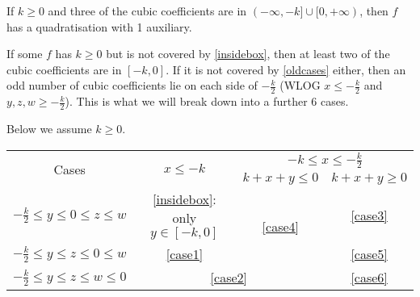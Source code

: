 \documentclass[11pt]{scrartcl}
\begin{document}
\begin{proposition}
	\label{insidebox}
If $k \ge 0$ and three of the cubic coefficients are in $(-\infty, -k] \cup [0, +\infty)$, then $f$ has a quadratisation with 1 auxiliary.
\end{proposition}

If some $f$ has $k \ge 0$ but is not covered by \ref{insidebox}, then at least two of the cubic coefficients are in $[-k, 0]$. 
If it is not covered by \ref{oldcases} either, then an odd number of cubic coefficients lie on each side of $-\frac{k}{2}$
(WLOG $x \le -\frac{k}{2}$ and $y, z, w \ge -\frac{k}{2}$). This is what we will break down into a further $6$ cases.

Below we assume $k \ge 0$.
\begin{table}[h!]
	\centering
	\begin{tabular}{|c|c|c|c|}
	\hline
	\multirow{2}{*}{Cases} &\multirow{2}{*}{$x \le -k$} &  \multicolumn{2}{c|}{$-k \le x \le -\frac{k}{2}$} \\\cline{3-4}
	
	& & $k + x + y \le 0$& $k + x + y \ge 0$ \\
		\hline 
		$ -\frac{k}{2} \le y \le 0 \le z \le w$ & \ref{insidebox}: only $y \in [-k,0]$ &  \multirow{2}{*}{\ref{case4}} & 
		\ref{case3}\\\cline{1-2}\cline{4-4}
		$ -\frac{k}{2} \le y \le z \le 0 \le w$ &  \ref{case1}& & \ref{case5}\\
		\hline 
		$ -\frac{k}{2} \le y \le z \le w \le 0$ & \multicolumn{2}{c|}{\ref{case2}}  & \ref{case6} \\
		\hline
	\end{tabular}
\end{table}
\end{document}
